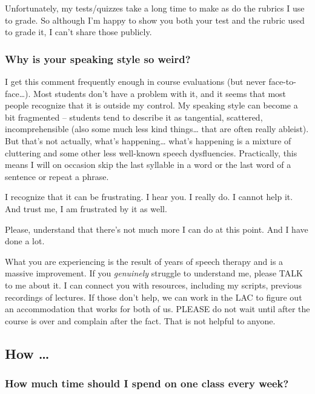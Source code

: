 Unfortunately, my tests/quizzes take a long time to make as do the rubrics I use to grade. So although I'm happy to show you both your test and the rubric used to grade it, I can't share those publicly.

\hypertarget{why-is-your-speaking-style-so-weird}{%
\subsubsection{Why is your speaking style so weird?}\label{why-is-your-speaking-style-so-weird}}

I get this comment frequently enough in course evaluations (but never face-to-face\ldots). Most students don't have a problem with it, and it seems that most people recognize that it is outside my control. My speaking style can become a bit fragmented -- students tend to describe it as tangential, scattered, incomprehensible (also some much less kind things\ldots{} that are often really ableist). But that's not actually, what's happening\ldots{} what's happening is a mixture of cluttering and some other less well-known speech dysfluencies. Practically, this means I will on occasion skip the last syllable in a word or the last word of a sentence or repeat a phrase.

I recognize that it can be frustrating. I hear you. I really do. I cannot help it. And trust me, I am frustrated by it as well.

Please, understand that there's not much more I can do at this point. And I have done a lot.

What you are experiencing is the result of years of speech therapy and is a massive improvement. If you \emph{genuinely} struggle to understand me, please TALK to me about it. I can connect you with resources, including my scripts, previous recordings of lectures. If those don't help, we can work in the LAC to figure out an accommodation that works for both of us. PLEASE do not wait until after the course is over and complain after the fact. That is not helpful to anyone.

\hypertarget{how}{%
\subsection{How \ldots{}}\label{how}}

\hypertarget{how-much-time-should-i-spend-on-one-class-every-week}{%
\subsubsection{How much time should I spend on one class every week?}\label{how-much-time-should-i-spend-on-one-class-every-week}}

